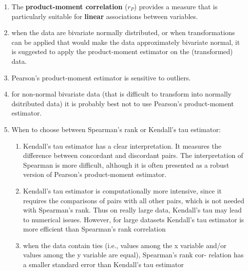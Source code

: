\begin{enumerate}
    \item The \textbf{product-moment correlation} ($r_P$) provides a measure that is particularly suitable for \textbf{linear} associations between variables. 
    \hfill \cite{statistics/book/Statistics-for-Data-Scientists/Maurits-Kaptein}

    \item when the data are bivariate normally distributed, or when transformations can be applied that would make the data approximately bivariate normal, it is suggested to apply the product-moment estimator on the (transformed) data. 
    \hfill \cite{statistics/book/Statistics-for-Data-Scientists/Maurits-Kaptein}

    \item Pearson’s product-moment estimator is sensitive to outliers.
    \hfill \cite{statistics/book/Statistics-for-Data-Scientists/Maurits-Kaptein}

    \item for non-normal bivariate data (that is difficult to transform into normally dsitributed data) it is probably best not to use Pearson’s product-moment estimator.
    \hfill \cite{statistics/book/Statistics-for-Data-Scientists/Maurits-Kaptein}

    \item When to choose between Spearman’s rank or Kendall’s tau estimator:
    \hfill \cite{statistics/book/Statistics-for-Data-Scientists/Maurits-Kaptein}
    \begin{enumerate}
        \item Kendall’s tau estimator has a clear interpretation. 
        It measures the difference between concordant and discordant pairs. 
        The interpretation of Spearman is more difficult, although it is often presented as a robust version of Pearson’s product-moment estimator.
        \hfill \cite{statistics/book/Statistics-for-Data-Scientists/Maurits-Kaptein}

        \item Kendall’s tau estimator is computationally more intensive, since it requires the comparisons of pairs with all other pairs, which is not needed with Spearman’s rank. 
        Thus on really large data, Kendall’s tau may lead to numerical issues. However, for large datasets Kendall’s tau estimator is more efficient than Spearman’s rank correlation
        \hfill \cite{statistics/book/Statistics-for-Data-Scientists/Maurits-Kaptein}

        \item when the data contain ties (i.e., values among the x variable and/or values among the y variable are equal), Spearman’s rank cor- relation has a smaller standard error than Kendall’s tau estimator
        \hfill \cite{statistics/book/Statistics-for-Data-Scientists/Maurits-Kaptein}
    \end{enumerate}


\end{enumerate}
